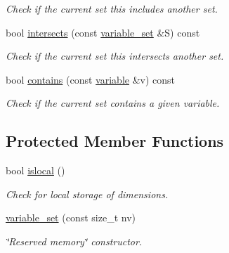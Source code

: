 \begin{DoxyCompactItemize}
\begin{DoxyCompactList}\small\item\em Check if the current set {\itshape this} includes another set. \end{DoxyCompactList}\item 
bool \hyperlink{classmerlin_1_1variable__set_a7ece5091c9e5a06d983b371b1a39059e}{intersects} (const \hyperlink{classmerlin_1_1variable__set}{variable\+\_\+set} \&S) const \hypertarget{classmerlin_1_1variable__set_a7ece5091c9e5a06d983b371b1a39059e}{}\label{classmerlin_1_1variable__set_a7ece5091c9e5a06d983b371b1a39059e}

\begin{DoxyCompactList}\small\item\em Check if the current set {\itshape this} intersects another set. \end{DoxyCompactList}\item 
bool \hyperlink{classmerlin_1_1variable__set_a915edc4be067c812121f3d684713637a}{contains} (const \hyperlink{classmerlin_1_1variable}{variable} \&v) const \hypertarget{classmerlin_1_1variable__set_a915edc4be067c812121f3d684713637a}{}\label{classmerlin_1_1variable__set_a915edc4be067c812121f3d684713637a}

\begin{DoxyCompactList}\small\item\em Check if the current set contains a given variable. \end{DoxyCompactList}\end{DoxyCompactItemize}
\subsection*{Protected Member Functions}
\begin{DoxyCompactItemize}
\item 
bool \hyperlink{classmerlin_1_1variable__set_ab1576b3d4c9033f7b79c173a73873d81}{islocal} ()\hypertarget{classmerlin_1_1variable__set_ab1576b3d4c9033f7b79c173a73873d81}{}\label{classmerlin_1_1variable__set_ab1576b3d4c9033f7b79c173a73873d81}

\begin{DoxyCompactList}\small\item\em Check for local storage of dimensions. \end{DoxyCompactList}\item 
\hyperlink{classmerlin_1_1variable__set_af20fada0cc25d46f952679d59ba8cb26}{variable\+\_\+set} (const size\+\_\+t nv)\hypertarget{classmerlin_1_1variable__set_af20fada0cc25d46f952679d59ba8cb26}{}\label{classmerlin_1_1variable__set_af20fada0cc25d46f952679d59ba8cb26}

\begin{DoxyCompactList}\small\item\em \char`\"{}\+Reserved memory\char`\"{} constructor. \end{DoxyCompactList}\end{DoxyCompactItemize}
